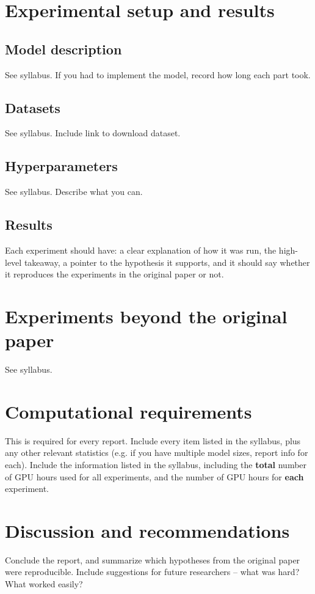 \documentclass[11pt,a4paper]{article}
\begin{document}
\section{Experimental setup and results}

\subsection{Model description}
See syllabus. If you had to implement the model, record how long each part took.

\subsection{Datasets}
See syllabus. Include link to download dataset.

\subsection{Hyperparameters}
See syllabus. Describe what you can.

\subsection{Results}
Each experiment should have: a clear explanation of how it was run, the high-level takeaway, a pointer to the hypothesis it supports, and it should say whether it reproduces the experiments in the original paper or not.

\section{Experiments beyond the original paper}
See syllabus.

\section{Computational requirements}
This is required for every report. Include every item listed in the syllabus, plus any other relevant statistics (e.g. if you have multiple model sizes, report info for each).
Include the information listed in the syllabus, including the \textbf{total} number of GPU hours used for all experiments, and the number of GPU hours for \textbf{each} experiment.

\section{Discussion and recommendations}
Conclude the report, and summarize which hypotheses from the original paper were reproducible. Include suggestions for future researchers -- what was hard? What worked easily? 



\end{document}
